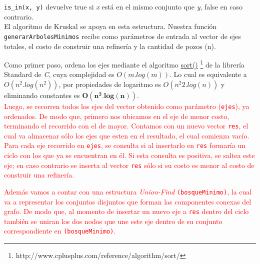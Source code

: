 \texttt{is_in(x, y)} devuelve true si \emph{x} est\'a en el mismo conjunto que \emph{y}, false en caso contrario. \\


El algoritmo de Kruskal se apoya en esta estructura. Nuestra funci\'on \texttt{generarArbolesMinimos} recibe como par\'ametros de entrada al vector de ejes totales, el costo de construir una refiner\'ia y la cantidad de pozos (n).


Como primer paso, ordena los ejes mediante el algoritmo  \href{http://www.cplusplus.com/reference/algorithm/sort/}{sort()} \footnote{http://www.cplusplus.com/reference/algorithm/sort/} de la librer\'ia Standard de \emph{C}, cuya complejidad es $O(m.log(m))$. Lo cual es equivalente a $O(n^2.log(n^2))$, por propiedades de logaritmo es $O(n^{2}2.log(n))$ y eliminando constantes es $\mathbf{O(n^2.log(n))}$. \\

	
\textcolor{red}{Luego, se recorren todos los ejes del vector obtenido como par\'ametro (\texttt{ejes}), ya ordenados. De modo que, primero nos ubicamos en el eje de menor costo, terminando el recorrido con el de mayor. Contamos con un nuevo vector \texttt{res}, el cual va almacenar s\'olo los ejes que esten en el resultado, el cual comienza vac\'io. Para cada eje recorrido en \texttt{ejes}, se consulta si al insertarlo en \texttt{res} formar\'ia un ciclo con los que ya se encuentran en \'el. Si esta consulta es positiva, se saltea este eje; en caso contrario se inserta al vector \texttt{res} s\'olo si su costo es menor al costo de construir una refiner\'ia.}

\textcolor{red}{Adem\'as vamos a contar con una estructura \emph{Union-Find} \texttt{(bosqueMinimo)}, la cual va a representar los conjuntos disjuntos que forman las componentes conexas del grafo. De modo que, al momento de insertar un nuevo eje a \texttt{res} dentro del ciclo tambi\'en se uniran los dos nodos que une este eje dentro de su conjunto correspondiente en \texttt{(bosqueMinimo)}.}\\

